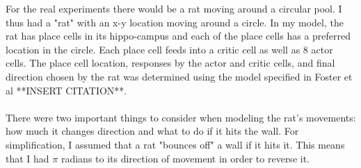 \documentclass[conference]{IEEEtran}
\begin{document}
For the real experiments there would be a rat moving around a circular pool. I thus had a "rat" with an x-y location moving around a circle. In my model, the rat has place cells in its hippo-campus and each of the place cells has a preferred location in the circle. Each place cell feeds into a critic cell as well as 8 actor cells. The place cell location, responses by the actor and critic cells, and final direction chosen by the rat was determined using the model specified in Foster et al **INSERT CITATION**. \\
\\
There were two important things to consider when modeling the rat's movements: how much it changes direction and what to do if it hits the wall. For simplification, I assumed that a rat "bounces off" a wall if it hits it. This means that I had $\pi$ radians to its direction of movement in order to reverse it. 
\end{document}
